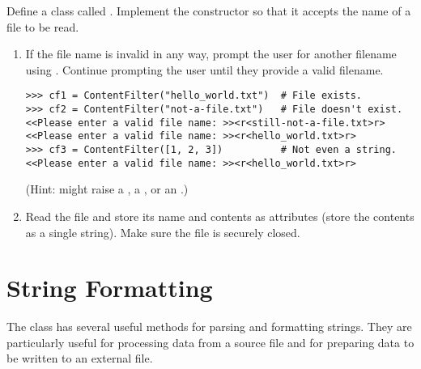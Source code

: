 \begin{problem} %
Define a class called .
Implement the constructor so that it accepts the name of a file to be read.
%
\begin{enumerate}
\item If the file name is invalid in any way, prompt the user for another filename using .
Continue prompting the user until they provide a valid filename.
\begin{lstlisting}
>>> cf1 = ContentFilter("hello_world.txt")  # File exists.
>>> cf2 = ContentFilter("not-a-file.txt")   # File doesn't exist.
<<Please enter a valid file name: >><r<still-not-a-file.txt>r>
<<Please enter a valid file name: >><r<hello_world.txt>r>
>>> cf3 = ContentFilter([1, 2, 3])          # Not even a string.
<<Please enter a valid file name: >><r<hello_world.txt>r>
\end{lstlisting}
(Hint:  might raise a , a , or an .)

\item Read the file and store its name and contents as attributes (store the contents as a single string).
Make sure the file is securely closed.
\end{enumerate}
\end{problem}

\section*{String Formatting} %

The  class has several useful methods for parsing and formatting strings.
They are particularly useful for processing data from a source file and for preparing data to be written to an external file.

